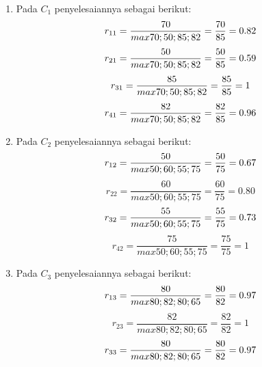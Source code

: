 \begin{enumerate}
	\item Pada $C_{1}$ penyelesaiannya sebagai berikut:
\begin{displaymath}
r_{11} = \frac{70}{max {70;50;85;82}} = \frac{70}{85} = 0.82\\
\end {displaymath}
\begin{displaymath}
r_{21} = \frac{50}{max {70;50;85;82}} = \frac{50}{85} = 0.59\\
\end{displaymath}
\begin{displaymath}
r_{31} = \frac{85}{max {70;50;85;82}} = \frac{85}{85} = 1\\
\end {displaymath}
\begin{displaymath}
r_{41} = \frac{82}{max {70;50;85;82}} = \frac{82}{85} = 0.96\\
\end {displaymath}
\item Pada $C_{2}$ penyelesaiannya sebagai berikut:
\begin{displaymath}
r_{12} = \frac{50}{max {50;60;55;75}} = \frac{50}{75} = 0.67\\
\end{displaymath}
\begin{displaymath}
r_{22} = \frac{60}{max {50;60;55;75}} = \frac{60}{75} = 0.80
\end{displaymath}
\begin{displaymath}
r_{32} = \frac{55}{max {50;60;55;75}} = \frac{55}{75} = 0.73\\
\end{displaymath}
\begin{displaymath}
r_{42} = \frac{75}{max {50;60;55;75}} = \frac{75}{75} = 1
\end{displaymath}
\item Pada $C_{3}$ penyelesaiannya sebagai berikut:
\begin{displaymath}
r_{13} = \frac{80}{max {80;82;80;65}} = \frac{80}{82} = 0.97\\
\end{displaymath}
\begin{displaymath}
r_{23} = \frac{82}{max {80;82;80;65}} = \frac{82}{82} = 1
\end{displaymath}
\begin{displaymath}
r_{33} = \frac{80}{max {80;82;80;65}} = \frac{80}{82} = 0.97\\
\end{displaymath}

\end{enumerate}
